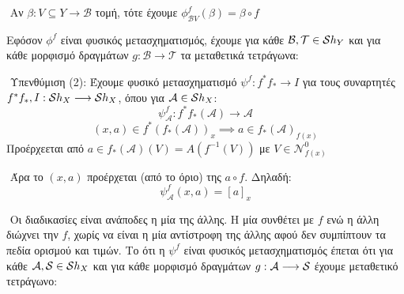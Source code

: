 $ $\newline
Αν $\beta : V\subseteq Y\longrightarrow \mathcal{B}$ τομή, τότε έχουμε $\phi^f_{\mathcal{B}V}(\beta) = \beta \circ f$

\begin{figure}[H]
    \centering
\end{figure}

\noindent Εφόσον $\phi^f$ είναι φυσικός μετασχηματισμός, έχουμε για κάθε $\mathcal{B},\mathcal{T} \in \mathcal{S} h_Y$ και για κάθε μορφισμό δραγμάτων $g:\mathcal{B}\longrightarrow \mathcal{T}$ τα μεταθετικά τετράγωνα:

\begin{figure}[H]
    \centering
\end{figure}

$ $\newline
Υπενθύμιση (2): Έχουμε φυσικό μετασχηματισμό $\psi^f:f^*f_* \rightarrow I$ για τους συναρτητές $f^*f_*, I : \mathcal{S} h_X \longrightarrow \mathcal{S} h_X$, όπου για $\mathcal{A} \in \mathcal{S} h_X$:
$$\psi^f_{\mathcal{A}}: f^*f_*(\mathcal{A})\longrightarrow \mathcal{A}$$
$$(x,a)\in f^*(f_*(\mathcal{A}))_x \implies a \in f_*(\mathcal{A})_{f(x)}$$ Προέρχεεται από $a \in f_*(\mathcal{A})(V) = A(f^{-1}(V))$ με $V \in \mathcal{N}^0_{f(x)}$ 

$ $\newline
Άρα το $(x,a)$ προέρχεται (από το όριο) της $a \circ f$. Δηλαδή:
$$\psi^f_{\mathcal{A}}(x,a) = [a]_x$$

$ $\newline
Οι διαδικασίες είναι ανάποδες η μία της άλλης. Η μία συνθέτει με $f$ ενώ η άλλη διώχνει την $f$, χωρίς να είναι η μία αντίστροφη της άλλης αφού δεν συμπίπτουν τα πεδία ορισμού και τιμών. Το ότι η $\psi^f$ είναι φυσικός μετασχηματισμός έπεται ότι για κάθε $\mathcal{A},\mathcal{S} \in \mathcal{S} h_X$ και για κάθε μορφισμό δραγμάτων $g:\mathcal{A}\longrightarrow \mathcal{S}$ έχουμε μεταθετικό τετράγωνο:


